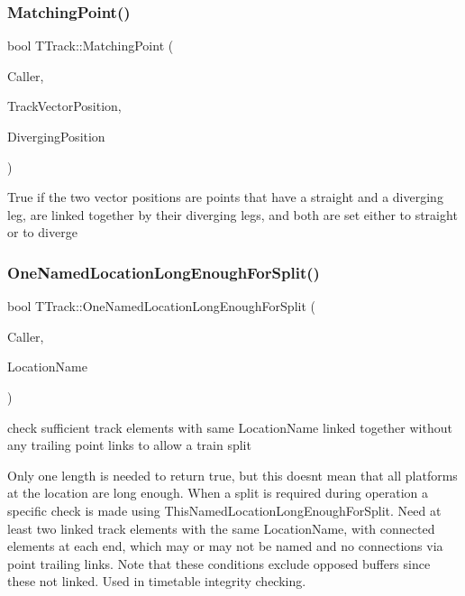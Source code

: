 \subsubsection{\texorpdfstring{Matching\+Point()}{MatchingPoint()}}
{\footnotesize\ttfamily bool T\+Track\+::\+Matching\+Point (\begin{DoxyParamCaption}\item[{int}]{Caller,  }\item[{unsigned int}]{Track\+Vector\+Position,  }\item[{unsigned int}]{Diverging\+Position }\end{DoxyParamCaption})}

True if the two vector positions are points that have a straight and a diverging leg, are linked together by their diverging legs, and both are set either to straight or to diverge \mbox{\label{class_t_track_a9d209cb6e24f67ba12020440a5e42347}} 
\subsubsection{\texorpdfstring{One\+Named\+Location\+Long\+Enough\+For\+Split()}{OneNamedLocationLongEnoughForSplit()}}
{\footnotesize\ttfamily bool T\+Track\+::\+One\+Named\+Location\+Long\+Enough\+For\+Split (\begin{DoxyParamCaption}\item[{int}]{Caller,  }\item[{Ansi\+String}]{Location\+Name }\end{DoxyParamCaption})}

check sufficient track elements with same Location\+Name linked together without any trailing point links to allow a train split

Only one length is needed to return true, but this doesn\textquotesingle{}t mean that all platforms at the location are long enough. When a split is required during operation a specific check is made using This\+Named\+Location\+Long\+Enough\+For\+Split. Need at least two linked track elements with the same Location\+Name, with connected elements at each end, which may or may not be named and no connections via point trailing links. Note that these conditions exclude opposed buffers since these not linked. Used in timetable integrity checking. \mbox{\label{class_t_track_a7c2888cb7acea2b9c65c5f9cc538df66}} 
